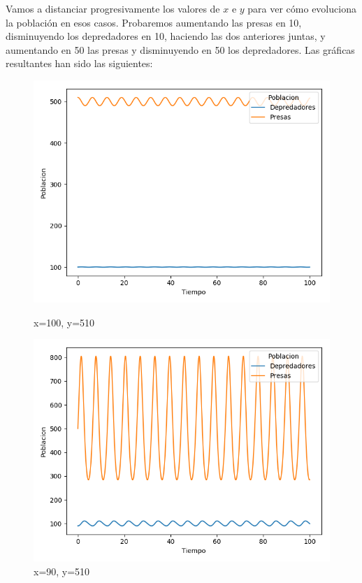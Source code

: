 \documentclass[11pt,a4paper]{article}
\begin{document}
Vamos a distanciar progresivamente los valores de $x$ e $y$ para ver cómo evoluciona la población en esos casos. Probaremos aumentando las
presas en 10, disminuyendo los depredadores en 10, haciendo las dos anteriores juntas, y aumentando en 50 las presas y disminuyendo en 50
los depredadores. Las gráficas resultantes han sido las siguientes:
\begin{figure}[H]
	\centering
	\begin{minipage}{0.5\textwidth}
	  \centering
	  \includegraphics[scale=0.4]{img/2-100-510.png}
	  \caption{x=100,  y=510}
	\end{minipage}%
	\begin{minipage}{0.5\textwidth}
	  \centering
	  \includegraphics[scale=0.4]{img/2-90-500.png}
	  \caption{x=90,  y=510}
	\end{minipage}
\end{figure}
\end{document}
